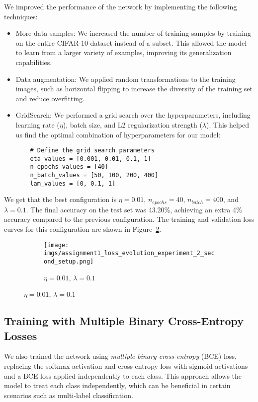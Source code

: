 \documentclass{article}
\begin{document}
We improved the performance of the network by implementing the following techniques:
\begin{itemize}
    \item More data samples: We increased the number of training samples by training on the entire CIFAR-10 dataset instead of a subset. This allowed the model to learn from a larger variety of examples, improving its generalization capabilities.
    \item Data augmentation: We applied random transformations to the training images, such as horizontal flipping to increase the diversity of the training set and reduce overfitting.
    \item GridSearch: We performed a grid search over the hyperparameters, including learning rate ($\eta$), batch size, and L2 regularization strength ($\lambda$). This helped us find the optimal combination of hyperparameters for our model:
    \begin{verbatim}
    # Define the grid search parameters
    eta_values = [0.001, 0.01, 0.1, 1]
    n_epochs_values = [40]
    n_batch_values = [50, 100, 200, 400]
    lam_values = [0, 0.1, 1]
    \end{verbatim}
\end{itemize}

We get that the best configuration is $\eta=0.01$, $n_{epochs}=40$, $n_{batch}=400$, and $\lambda=0.1$. The final accuracy on the test set was 43.20\%, achieving an extra 4\% accuracy compared to the previous configuration. The training and validation loss curves for this configuration are shown in Figure~\ref{fig:exp_best}.
\begin{figure}[h!]
    \centering
    \begin{subfigure}{0.45\textwidth}
        \texttt{[image: imgs/assignment1\_loss\_evolution\_experiment\_2\_second\_setup.png]}
        \caption{$\eta=0.01$, $\lambda=0.1$}
        \label{fig:exp_best}
    \end{subfigure}
\end{figure}



\subsection{Training with Multiple Binary Cross-Entropy Losses}

We also trained the network using \textit{multiple binary cross-entropy} (BCE) loss, replacing the softmax activation and cross-entropy loss with sigmoid activations and a BCE loss applied independently to each class. This approach allows the model to treat each class independently, which can be beneficial in certain scenarios such as multi-label classification.
\end{document}
